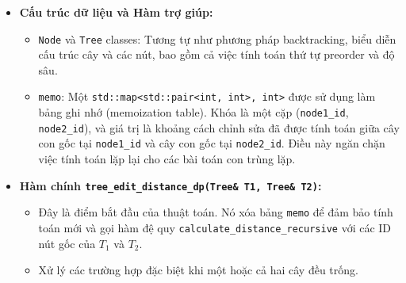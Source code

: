 \documentclass{article}
\begin{document}
\begin{itemize}
    \item \textbf{Cấu trúc dữ liệu và Hàm trợ giúp:}
    \begin{itemize}
        \item \texttt{Node} và \texttt{Tree} classes: Tương tự như phương pháp backtracking, biểu diễn cấu trúc cây và các nút, bao gồm cả việc tính toán thứ tự preorder và độ sâu.
        \item \texttt{memo}: Một \texttt{std::map<std::pair<int, int>, int>} được sử dụng làm bảng ghi nhớ (memoization table). Khóa là một cặp (\texttt{node1\_id}, \texttt{node2\_id}), và giá trị là khoảng cách chỉnh sửa đã được tính toán giữa cây con gốc tại \texttt{node1\_id} và cây con gốc tại \texttt{node2\_id}. Điều này ngăn chặn việc tính toán lặp lại cho các bài toán con trùng lặp.
    \end{itemize}

    \item \textbf{Hàm chính \texttt{tree\_edit\_distance\_dp(Tree\& T1, Tree\& T2)}:}
    \begin{itemize}
        \item Đây là điểm bắt đầu của thuật toán. Nó xóa bảng \texttt{memo} để đảm bảo tính toán mới và gọi hàm đệ quy \texttt{calculate\_distance\_recursive} với các ID nút gốc của $T_1$ và $T_2$.
        \item Xử lý các trường hợp đặc biệt khi một hoặc cả hai cây đều trống.
    \end{itemize}


\end{itemize}
\end{document}
